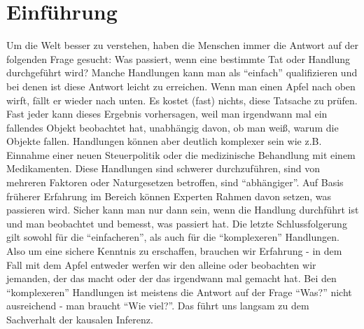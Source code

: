 \documentclass[12pt,a4paper,twoside]{scrartcl}
\numberwithin{equation}{section}
\begin{document}
\renewcommand\sectionmark[1]{\markboth{\thesection\quad\MakeUppercase{#1}}{\thesection\quad\MakeUppercase{#1}}}
\renewcommand\subsectionmark[1]{\markright{\thesubsection\quad\MakeUppercase{#1}}}

\tableofcontents
\clearpage
\listoffigures
\clearpage

\pagestyle{normal}

\nocite{*} %
\section{Einführung}\label{sec:einführung}
Um die Welt besser zu verstehen, haben die Menschen immer die Antwort auf der folgenden Frage gesucht: Was passiert, wenn eine bestimmte Tat oder Handlung durchgeführt wird? Manche Handlungen kann man als \enquote{einfach} qualifizieren und bei denen ist diese Antwort leicht zu erreichen. Wenn man einen Apfel nach oben wirft, fällt er wieder nach unten. Es kostet (fast) nichts, diese Tatsache zu prüfen. Fast jeder kann dieses Ergebnis vorhersagen, weil man irgendwann mal ein fallendes Objekt beobachtet hat, unabhängig davon, ob man weiß, warum die Objekte fallen. Handlungen können aber deutlich komplexer sein wie z.B. Einnahme einer neuen Steuerpolitik oder die medizinische Behandlung mit einem Medikamenten. Diese Handlungen sind schwerer durchzuführen, sind von mehreren Faktoren oder Naturgesetzen betroffen, sind \enquote{abhängiger}. Auf Basis früherer Erfahrung im Bereich können Experten Rahmen davon setzen, was passieren wird. Sicher kann man nur dann sein, wenn die Handlung durchführt ist und man beobachtet und bemesst, was passiert hat. Die letzte Schlussfolgerung gilt sowohl für die \enquote{einfacheren}, als auch für die \enquote{komplexeren} Handlungen. Also um eine sichere Kenntnis zu erschaffen, brauchen wir Erfahrung - in dem Fall mit dem Apfel entweder werfen wir den alleine oder beobachten wir jemanden, der das macht oder der das irgendwann mal gemacht hat. Bei den \enquote{komplexeren} Handlungen ist meistens die Antwort auf der Frage \enquote{Was?}  nicht ausreichend - man braucht \enquote{Wie viel?}. Das führt uns langsam zu dem Sachverhalt der kausalen Inferenz.      
\end{document}
